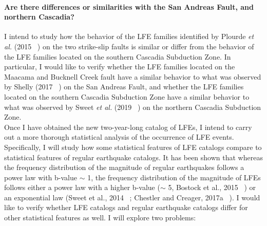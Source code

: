 \documentclass[letterpaper, 12pt]{article}
\begin{document}
\paragraph{Are there differences or similarities with the San Andreas Fault, and northern Cascadia?} I intend to study how the behavior of the LFE families identified by Plourde \textit{et al.} (2015  ~\cite{PLO_2015}) on the two strike-slip faults is similar or differ from the behavior of the LFE families located on the southern Cascadia Subduction Zone. In particular, I would like to verify whether the LFE families located on the Maacama and Bucknell Creek fault have a similar behavior to what was observed by Shelly (2017 ~\cite{SHE_2017}) on the San Andreas Fault, and whether the LFE families located on the southern Cascadia Subduction Zone have a similar behavior to what was observed by Sweet \textit{et al.} (2019 ~\cite{SWE_2019}) on the northern Cascadia Subduction Zone. \\

Once I have obtained the new two-year-long catalog of LFEs, I intend to carry out a more thorough statistical analysis of the occurrence of LFE events. Specifically, I will study how some statistical features of LFE catalogs compare to statistical features of regular earthquake catalogs. It has been shown that whereas the frequency distribution of the magnitude of regular earthquakes follows a power law with b-value $\sim$ 1, the frequency distribution of the magnitude of LFEs follows either a power law with a higher b-value ($\sim$ 5, Bostock et al., 2015 ~\cite{BOS_2015}) or an exponential law (Sweet et al., 2014 ~\cite{SWE_2014}; Chestler and Creager, 2017a ~\cite{CHE_2017_JGR}). I would like to verify whether LFE catalogs and regular earthquake catalogs differ for other statistical features as well. I will explore two problems:
\end{document}
